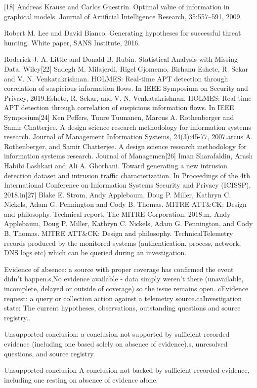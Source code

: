 \documentclass[a4paper,11pt]{article}
\begin{document}
[18] Andreas Krause and Carlos Guestrin. Optimal value of information in graphical models. Journal of Artificial Intelligence Research, 35:557–591, 2009.\par
[19] Robert M. Lee and David Bianco. Generating hypotheses for successful threat hunting. White paper, SANS Institute, 2016.\par
[20] Roderick J. A. Little and Donald B. Rubin. Statistical Analysis with Missing Data. Wiley[22] Sadegh M. Milajerdi, Rigel Gjomemo, Birhanu Eshete, R. Sekar and V. N. Venkatakrishnan. HOLMES: Real-time APT detection through correlation of suspicious information flows. In IEEE Symposium on Security and Privacy, 2019.Eshete, R. Sekar, and V. N. Venkatakrishnan. HOLMES: Real-time APT detection through correlation of suspicious information flows. In IEEE Symposium[24] Ken Peffers, Tuure Tuunanen, Marcus A. Rothenberger and Samir Chatterjee. A design science research methodology for information systems research. Journal of Management Information Systems, 24(3):45-77, 2007.arcus A. Rothenberger, and Samir Chatterjee. A design science research methodology for information systems research. Journal of Managemen[26] Iman Sharafaldin, Arash Habibi Lashkari and Ali A. Ghorbani. Toward generating a new intrusion detection dataset and intrusion traffic characterization. In Proceedings of the 4th International Conference on Information Systems Security and Privacy (ICISSP), 2018.in[27] Blake E. Strom, Andy Applebaum, Doug P. Miller, Kathryn C. Nickels, Adam G. Pennington and Cody B. Thomas. MITRE ATT\&CK: Design and philosophy. Technical report, The MITRE Corporation, 2018.m, Andy Applebaum, Doug P. Miller, Kathryn C. Nickels, Adam G. Pennington, and Cody B. Thomas. MITRE ATT\&CK: Design and philosophy. TechnicalTelemetry records produced by the monitored systems (authentication, process, network, DNS logs etc) which can be queried during an investigation.\par
Evidence of absence: a source with proper coverage has confirmed the event didn't happen.s,No evidence available - data simply weren't there (unavailable, incomplete, delayed or outside of coverage) so the issue remains open. cEvidence request: a query or collection action against a telemetry source.caInvestigation state: The current hypotheses, observations, outstanding questions and source registry..\par
Unsupported conclusion: a conclusion not supported by sufficient recorded evidence (including one based solely on absence of evidence).s, unresolved questions, and source registry.\par
Unsupported conclusion A conclusion not backed by sufficient recorded evidence, including one resting on absence of evidence alone.\par
\end{document}
